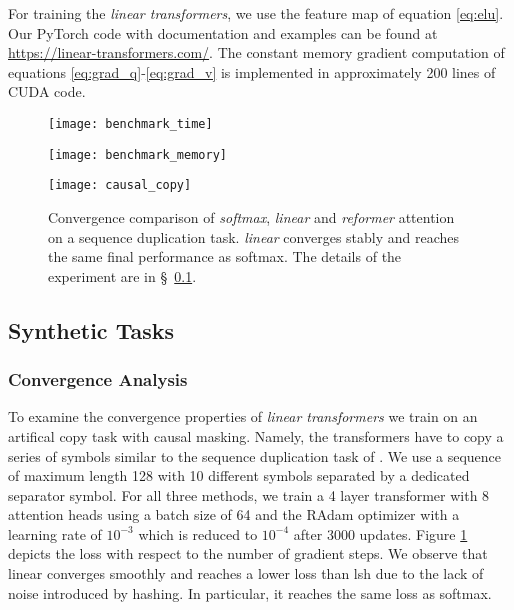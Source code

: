 \documentclass{article}
\newcommand{\linears}{\emph{linear transformers}}
\begin{document}
For training the \linears{}, we use the feature map of equation
\ref{eq:elu}. Our PyTorch \cite{paszke2019pytorch} code with documentation and
examples can be found at \url{https://linear-transformers.com/}. The constant
memory gradient computation of equations \ref{eq:grad_q}-\ref{eq:grad_v} is
implemented in approximately 200 lines of CUDA code.

\begin{figure*}
    \centering
    \begin{subfigure}[t]{\columnwidth}
        \texttt{[image: benchmark\_time]}
    \end{subfigure}
    \begin{subfigure}[t]{\columnwidth}
        \texttt{[image: benchmark\_memory]}
    \end{subfigure}
    \caption{Comparison of the computational requirements for a forward/backward pass for
             Reformer (lsh-X), softmax attention and linear attention. Linear
             and Reformer models scale linearly with the sequence length unlike
             softmax which scales with the square of the sequence length both
             in memory and time. Full details of the experiment can be found in
             \S~\ref{sec:synthetic}.}
    \label{fig:benchmark}
\end{figure*}

\begin{figure}
    \centering
    \texttt{[image: causal\_copy]}
    \caption{Convergence comparison of \emph{softmax}, \emph{linear} and
             \emph{reformer} attention on a sequence duplication task.
             \emph{linear} converges stably and reaches the same final
             performance as softmax. The details of the experiment are in
             \S~\ref{sec:synthetic}.}
    \label{fig:causal-copy}
\end{figure}

\subsection{Synthetic Tasks} \label{sec:synthetic}

\subsubsection{Convergence Analysis}

To examine the convergence properties of \linears{} we train on an
artifical copy task with causal masking. Namely, the transformers have to copy
a series of symbols similar to the sequence duplication task of \citet{kitaev2020reformer}. We
use a sequence of maximum length 128 with 10 different symbols separated by a
dedicated separator symbol. For all three methods, we train a 4 layer
transformer with 8 attention heads using a batch size of 64 and the RAdam
optimizer \cite{liu2019variance} with a learning rate of $10^{-3}$ which is
reduced to $10^{-4}$ after 3000 updates. Figure \ref{fig:causal-copy} depicts
the loss with respect to the number of gradient steps. We observe that
linear converges smoothly and reaches a lower loss than lsh due to
the lack of noise introduced by hashing. In particular, it reaches
the same loss as softmax.
\end{document}
